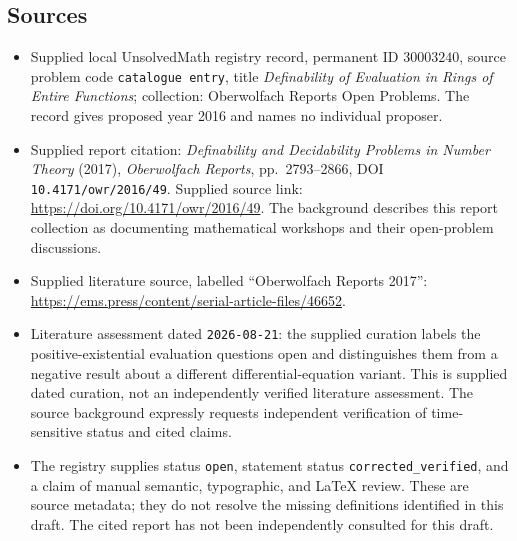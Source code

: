 \documentclass[11pt]{article}
\begin{document}
\subsection{Sources}
\begin{itemize}
\item Supplied local UnsolvedMath registry record, permanent ID \(30003240\), source problem code \texttt{catalogue entry}, title \emph{Definability of Evaluation in Rings of Entire Functions}; collection: Oberwolfach Reports Open Problems. The record gives proposed year 2016 and names no individual proposer.
\item Supplied report citation: \emph{Definability and Decidability Problems in Number Theory} (2017), \emph{Oberwolfach Reports}, pp.\ 2793--2866, DOI \texttt{10.4171/owr/2016/49}. Supplied source link: \url{https://doi.org/10.4171/owr/2016/49}. The background describes this report collection as documenting mathematical workshops and their open-problem discussions.
\item Supplied literature source, labelled ``Oberwolfach Reports 2017'': \url{https://ems.press/content/serial-article-files/46652}.
\item Literature assessment dated \texttt{2026-08-21}: the supplied curation labels the positive-existential evaluation questions open and distinguishes them from a negative result about a different differential-equation variant. This is supplied dated curation, not an independently verified literature assessment. The source background expressly requests independent verification of time-sensitive status and cited claims.
\item The registry supplies status \texttt{open}, statement status \texttt{corrected\_verified}, and a claim of manual semantic, typographic, and LaTeX review. These are source metadata; they do not resolve the missing definitions identified in this draft. The cited report has not been independently consulted for this draft.
\end{itemize}
\end{document}
